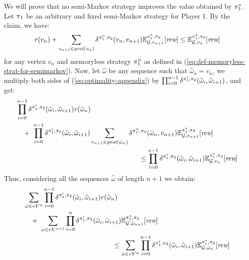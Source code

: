 \begin{myproof}
  We will prove that  no semi-Markov  strategy improves the value obtained by $\pi^*_{1}$.  Let $\pi_{1}$ be an arbitrary and fixed semi-Markov strategy for Player 1.  By the claim, we have:
  \begin{equation}\label{eq:optimality-appendix}
    \mathit{r}(v_n) + \sum_{v_{n+1} \in \mathit{post}(v_n)} \delta^{\pi_{1}^n,\pi_{2}}(v_n, v_{n+1}) \mathbb{E}^{\pi^*_{1}, \pi_{2}}_{\mathcal{G},v_{n+1}}[\textit{rew}] \leq \mathbb{E}^{\pi^*_{1}, \pi_{2}}_{\mathcal{G},v_n}[\textit{rew}]
  \end{equation}
  for any vertex $v_n$ and memoryless strategy $\pi_{1}^n$ as defined in (\ref{eq:def-memoryless-strat-for-semimarkov}).  Now, let $\hat{\omega}$ be any sequence such that
  $\hat{\omega}_n = v_n$, we multiply both sides of (\ref{eq:optimality-appendix}) by $\prod^{n-1}_{i=0} \delta^{\pi_{1}^i,\pi_{2}}(\hat{\omega}_i,\hat{\omega}_{i+1})$,
  and get:
  \begin{align*}
    & \prod^{n-1}_{i=0}\delta^{\strat{1}^i, \strat{2}}(\hat{\omega}_i, \hat{\omega}_{i+1}) \reward(\hat{\omega}_n) \\
    & \quad + \ \prod^{n-1}_{i=0}\delta^{\strat{1}^i,\strat{2}}(\hat{\omega}_i, \hat{\omega}_{i+1}) \sum_{v_{n+1} \in \post(\hat{\omega}_n)}  \delta^{\strat{1}^n,\strat{2}}(\hat{\omega}_n, v_{n+1}) \Expect{\starredstrat{1}}{\strat{2}}_{\StochG,v_{n+1}}[\Rewards] \\
    & \hspace{18em} \leq 
    \prod^{n-1}_{i=0}\delta^{\strat{1}^i,\strat{2}}(\hat{\omega}_i,\hat{\omega}_{i+1}) \Expect{\starredstrat{1}}{\strat{2}}_{\StochG,v_n}[\Rewards]
  \end{align*}
  Thus,  considering all the sequences $\hat{\omega}$ of length $n+1$ we obtain:
  \begin{align*}
    & \sum_{\hat{\omega} \in vV^{n}} \prod^{n-1}_{i=0}\delta^{\strat{1}^i,\strat{2}}(\hat{\omega}_i,  \hat{\omega}_{i+1}) \reward(\hat{\omega}_n) \\
    & \quad + \ \sum_{\hat{\omega} \in vV^{n+1}} \prod^{n}_{i=0}\delta^{\strat{1}^i,\strat{2}}(\hat{\omega}_i,\hat{\omega}_{i+1})  \Expect{\starredstrat{1}}{\strat{2}}_{\StochG,\hat{\omega}_{n+1}}[\Rewards]\\
    & \hspace{13em} \leq 
	\sum_{\hat{\omega} \in vV^{n}} \prod^{n-1}_{i=0}\delta^{\strat{1}^i,\strat{2}}(\hat{\omega}_i, \hat{\omega}_{i+1}) \Expect{\starredstrat{1}}{\strat{2}}_{\StochG,\hat{\omega}_n}[\Rewards]
  \end{align*}

\end{myproof}
